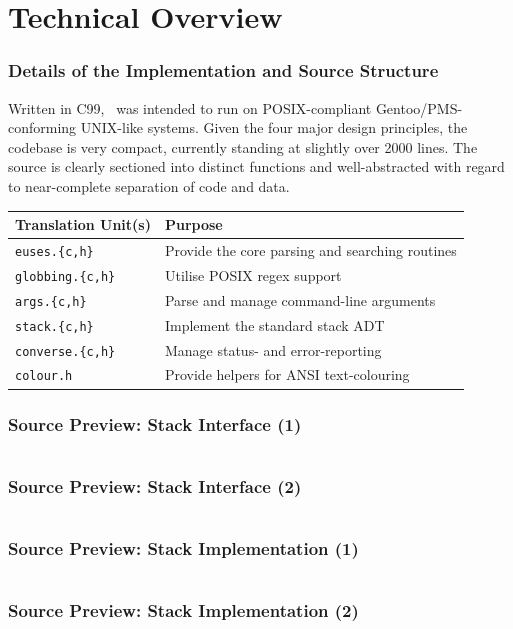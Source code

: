 \documentclass{beamer}
\numberwithin{figure}{section}
\newcommand\chext{.{\fontfamily{cmr}\{}c,h{\fontfamily{cmr}\}}}
\newcounter{firstsrcline}
\newcounter{lastsrcline}
\newcommand\srclinelimit{29}
\newcommand\resetsrclines{%
    \setcounter{firstsrcline}{1}
    \setcounter{lastsrcline}{\thefirstsrcline+\srclinelimit}
}
\newcommand\continuesource[1]{%
    \inputminted[firstline=\thefirstsrcline, lastline=\thelastsrcline,
        firstnumber=\thefirstsrcline]{c}{listings/#1}
    \setcounter{firstsrcline}{\thelastsrcline+1}
    \setcounter{lastsrcline}{\thefirstsrcline+\srclinelimit}
}
\newcommand\programname{%
    \texorpdfstring{\raisebox{.5pt}{\ttfamily owd-euses}}{'owd-euses'}}
\begin{document}
\section{Technical Overview}
\begin{frame}
    \frametitle{Details of the Implementation and Source Structure}
    Written in C99, \programname\ was intended to run on POSIX-compliant
    Gentoo/PMS-conforming UNIX-like systems. Given the four major design
    principles, the codebase is very compact, currently standing at slightly
    over 2000 lines. The source is clearly sectioned into distinct functions and
    well-abstracted with regard to near-complete separation of code and data.
    \pause

    \begin{center}
        \begin{tabular}{ll}
            \hline
            \textbf{Translation Unit(s)} & \textbf{Purpose} \\
            \hline
            \texttt{euses\chext} & Provide the core parsing and searching
                routines \\
            \texttt{globbing\chext} & Utilise POSIX regex support \\
            \texttt{args\chext} & Parse and manage command-line arguments \\
            \texttt{stack\chext} & Implement the standard stack ADT \\
            \texttt{converse\chext} & Manage status- and error-reporting \\
            \texttt{colour.h} & Provide helpers for ANSI text-colouring \\
            \hline
        \end{tabular}
    \end{center}
\end{frame}
\begin{frame}
    \frametitle{Source Preview: Stack Interface (1)}
    \resetsrclines
    \continuesource{stack.h}
\end{frame}
\begin{frame}
    \frametitle{Source Preview: Stack Interface (2)}
    \continuesource{stack.h}
\end{frame}
\begin{frame}
    \frametitle{Source Preview: Stack Implementation (1)}
    \resetsrclines
    \continuesource{stack.c}
\end{frame}
\begin{frame}
    \frametitle{Source Preview: Stack Implementation (2)}
    \continuesource{stack.c}
\end{frame}
\end{document}
